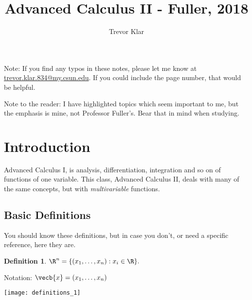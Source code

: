 \documentclass[a5paper]{article}
\title{Advanced Calculus II - Fuller, 2018}
\author{Trevor Klar}
\theoremstyle{definition}%
\newtheorem*{definition*}{Definition}
\numberwithin{exercise}{section}
\theoremstyle{remark}%
\begin{document}
\maketitle

\tableofcontents



\begin{highlight}
Note: If you find any typos in these notes, please let me know at \\ \href{mailto:trevor.klar.834@my.csun.edu}{trevor.klar.834@my.csun.edu}. If you could include the page number, that would be helpful. 

Note to the reader: I have highlighted topics which seem important to me, but the emphasis is mine, not Professor Fuller's. Bear that in mind when studying. 
\end{highlight}

\pagebreak
\section{Introduction}

Advanced Calculus I, is analysis, differentiation, integration and so on of functions of one variable. This class, Advanced Calculus II, deals with many of the same concepts, but with \emph{multivariable} functions. 

\subsection{Basic Definitions}

You should know these definitions, but in case you don't, or need a specific reference, here they are. 

\begin{definition*}
$\R^n=\{(x_1, \ldots, x_n):x_i\in \R\}.$
\end{definition*}

Notation: $\vecb{x}=(x_1, \ldots, x_n)$

\begin{center}
\texttt{[image: definitions\_1]}
\end{center}
\end{document}
